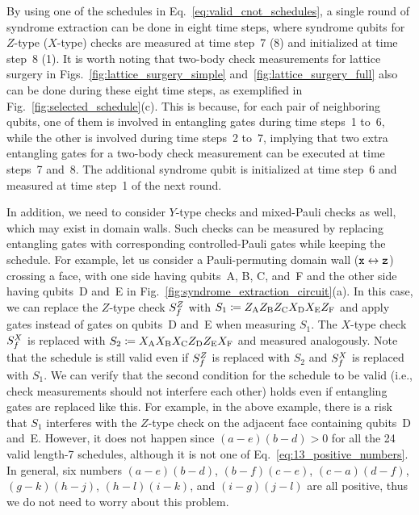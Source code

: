 \documentclass[
 prx,
 reprint,
 superscriptaddress,
 longbibliography,
 dvipsnames
]{revtex4-2}
\begin{document}
By using one of the schedules in Eq.~\eqref{eq:valid_cnot_schedules}, a single round of syndrome extraction can be done in eight time steps, where syndrome qubits for $Z$-type ($X$-type) checks are measured at time step~7 (8) and initialized at time step~8 (1).
It is worth noting that two-body check measurements for lattice surgery in Figs.~\ref{fig:lattice_surgery_simple} and~\ref{fig:lattice_surgery_full} also can be done during these eight time steps, as exemplified in Fig.~\ref{fig:selected_schedule}(c).
This is because, for each pair of neighboring qubits, one of them is involved in entangling gates during time steps~1 to~6, while the other is involved during time steps~2 to~7, implying that two extra entangling gates for a two-body check measurement can be executed at time steps~7 and~8.
The additional syndrome qubit is initialized at time step~6 and measured at time step~1 of the next round.

In addition, we need to consider $Y$-type checks and mixed-Pauli checks as well, which may exist in domain walls.
Such checks can be measured by replacing entangling gates with corresponding controlled-Pauli gates while keeping the schedule.
For example, let us consider a Pauli-permuting domain wall ($\texttt{x} \leftrightarrow \texttt{z}$) crossing a face, with one side having qubits~A, B, C, and~F and the other side having qubits~D and~E in Fig.~\ref{fig:syndrome_extraction_circuit}(a).
In this case, we can replace the $Z$-type check $S_{f}^Z$ with $S_1 \coloneqq Z_{\mathrm{A}} Z_{\mathrm{B}} Z_{\mathrm{C}} X_{\mathrm{D}} X_{\mathrm{E}} Z_{\mathrm{F}}$ and apply \cnot gates instead of \cz gates on qubits~D and~E when measuring $S_1$.
The $X$-type check $S_{f}^X$ is replaced with $S_2 \coloneqq X_{\mathrm{A}} X_{\mathrm{B}} X_{\mathrm{C}} Z_{\mathrm{D}} Z_{\mathrm{E}} X_{\mathrm{F}}$ and measured analogously.
Note that the schedule is still valid even if $S_{f}^Z$ is replaced with $S_2$ and $S_{f}^X$ is replaced with $S_1$.
We can verify that the second condition for the schedule to be valid (i.e., check measurements should not interfere each other) holds even if entangling gates are replaced like this.
For example, in the above example, there is a risk that $S_1$ interferes with the $Z$-type check on the adjacent face containing qubits~D and~E.
However, it does not happen since $(a - e)(b - d) > 0$ for all the 24 valid length-7 schedules, although it is not one of Eq.~\eqref{eq:13_positive_numbers}.
In general, six numbers $(a-e)(b-d)$, $(b-f)(c-e)$, $(c-a)(d-f)$, $(g-k)(h-j)$, $(h-l)(i-k)$, and $(i-g)(j-l)$ are all positive, thus we do not need to worry about this problem.
\end{document}
